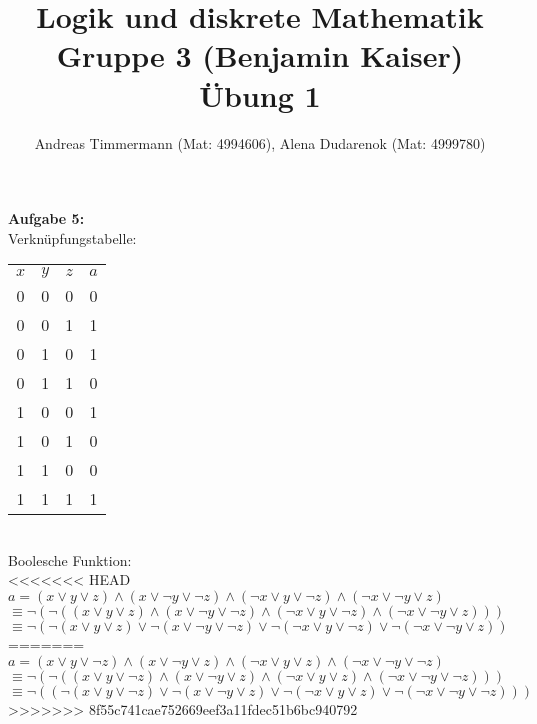 \documentclass[a4paper]{scrartcl}
\title{Logik und diskrete Mathematik\\Gruppe 3 (Benjamin Kaiser)\\ Übung 1}
\author{Andreas Timmermann (Mat: 4994606), Alena Dudarenok (Mat: 4999780)}
\begin{document}
	\maketitle
	\begin{flushleft}
		\textbf{Aufgabe 5:}\\[1em]
		Verknüpfungstabelle: \\
		\begin{tabular}{|c|c|c|c|}
			$x$ & $y$ & $z$ & $a$ \\
			0 & 0 & 0 & 0 \\
			0 & 0 & 1 & 1 \\
			0 & 1 & 0 & 1 \\
			0 & 1 & 1 & 0 \\
			1 & 0 & 0 & 1 \\
			1 & 0 & 1 & 0 \\
			1 & 1 & 0 & 0 \\
			1 & 1 & 1 & 1 \\
		 \end{tabular}\\[1em]
		 Boolesche Funktion: \\
<<<<<<< HEAD
		 $a = (x\vee y\vee z)\wedge (x\vee \neg y\vee \neg z)\wedge (\neg x\vee y\vee \neg z) \wedge (\neg x\vee \neg y\vee z)$\\
		 $\equiv \neg(\neg((x\vee y\vee z)\wedge (x\vee \neg y\vee \neg z)\wedge (\neg x\vee y\vee \neg z) \wedge (\neg x\vee \neg y\vee z)))$\\
		 $\equiv \neg(\neg(x\vee y\vee z)\vee \neg(x\vee \neg y\vee \neg z)\vee \neg(\neg x\vee y\vee \neg z) \vee \neg(\neg x\vee \neg y\vee z))$\\
=======
		 $a = (x\vee y\vee \neg z)\wedge (x\vee \neg y\vee z)\wedge (\neg x\vee y\vee z) \wedge (\neg x\vee \neg y\vee \neg z)$\\
		 $ \equiv \neg(\neg((x\vee y\vee \neg z)\wedge (x\vee \neg y\vee z)\wedge (\neg x\vee y\vee z) \wedge (\neg x\vee \neg y\vee \neg z)))$\\
		 $ \equiv \neg((\neg(x\vee y\vee \neg z)\vee \neg(x\vee \neg y\vee z)\vee \neg(\neg x\vee y\vee z) \vee \neg(\neg x\vee \neg y\vee \neg z)))$\\
>>>>>>> 8f55c741cae752669eef3a11fdec51b6bc940792
 	\end{flushleft}
\end{document}
